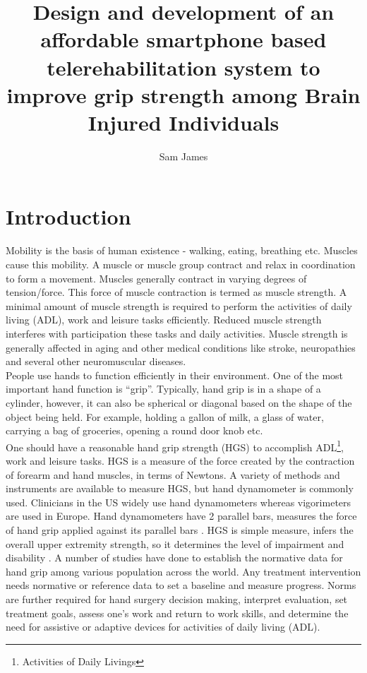 \documentclass[12pt]{article}
\title{Design and development of an affordable smartphone based telerehabilitation system to improve grip strength among Brain Injured Individuals}
\author{Sam James}
\begin{document}
\maketitle
\section{Introduction}

Mobility is the basis of human existence - walking, eating, breathing etc. Muscles cause this mobility. A muscle or muscle group  contract and relax in coordination to form a movement. Muscles generally contract in varying degrees of tension/force. This force of muscle contraction is termed as muscle strength.  A minimal amount of muscle strength is required to perform the activities of daily living (ADL), work and leisure tasks efficiently. Reduced muscle strength interferes with participation these tasks  and daily activities.  Muscle strength is generally affected in aging and other medical conditions like stroke, neuropathies and several other neuromuscular diseases. ~\\

People use hands to function efficiently in their environment. One of the most important hand function is \textquotedblleft grip\textquotedblright. Typically, hand grip is in a shape of a cylinder, however, it can also be spherical or diagonal based on the shape of the object being held. For example, holding a gallon of milk, a glass of water, carrying a bag of groceries, opening a round door knob etc.~\\

One should have a reasonable hand grip strength (HGS) to accomplish ADL\footnote{Activities of Daily Livings}, work and leisure tasks. HGS is a measure of the force created by the contraction of forearm and hand muscles, in terms of Newtons. A variety of methods and instruments are available to measure HGS, but hand dynamometer is commonly used. Clinicians in the US widely use hand dynamometers whereas vigorimeters are used in Europe. Hand dynamometers have 2 parallel bars, measures the force of hand grip applied against its parallel bars \cite{Innes1999}. HGS is simple measure, infers the overall upper extremity strength, so it determines the level of impairment and disability \cite{Mitsionis2009}. A number of studies have done to establish the normative data for hand grip among various population across the world\cite{Massy-Westropp2011}. Any treatment intervention needs normative or reference data to set a baseline and measure progress\cite{Werle2009}. Norms are further required for hand surgery decision making, interpret evaluation, set treatment goals, assess one's work and  return to work skills, and determine the need for assistive or adaptive devices for activities of daily living (ADL)\cite{Peters2011}. 
\end{document}
